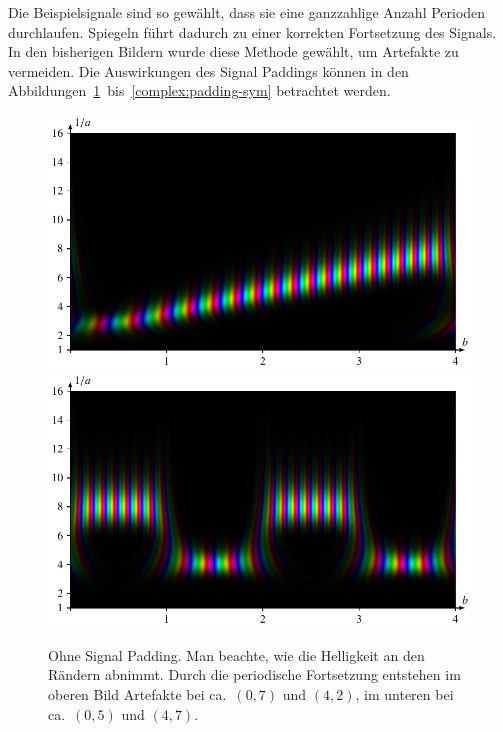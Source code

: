 Die Beispielsignale sind so gewählt, dass sie eine ganzzahlige Anzahl Perioden durchlaufen. 
Spiegeln führt dadurch zu einer korrekten Fortsetzung des Signals.
In den bisherigen Bildern wurde diese Methode gewählt, um Artefakte zu vermeiden.
Die Auswirkungen des Signal Paddings können in den Abbildungen~\ref{complex:padding-none}~bis~\ref{complex:padding-sym} betrachtet werden.
\begin{figure}
	\centering
	\includegraphics[width=\linewidth, keepaspectratio]{papers/complex/images/padding_none_sweep.pdf}
	\includegraphics[width=\linewidth, keepaspectratio]{papers/complex/images/padding_none_square.pdf}
	\caption{Ohne Signal Padding. Man beachte, wie die Helligkeit an den Rändern abnimmt. Durch die periodische Fortsetzung entstehen im oberen Bild Artefakte bei ca.~$(0, 7)$ und $(4, 2)$, im unteren bei ca.~$(0,5)$ und $(4,7)$.} \label{complex:padding-none}
\end{figure}

